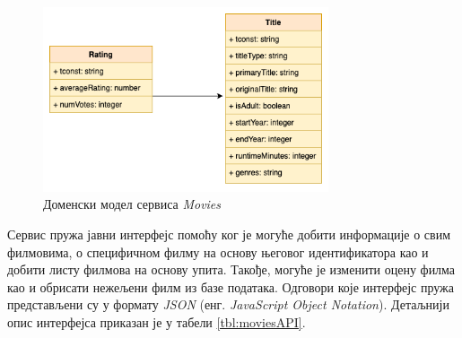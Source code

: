 \documentclass[12pt,oneside]{memoir}
\begin{document}
\begin{figure}[!ht]
  \centering
  \includegraphics[width=0.75\textwidth]{matfmaster/img/moviesShema.png}
  \caption{Доменски модел сервиса \textit{Movies}}
  \label{fig:moviesShema}
\end{figure}
Сервис пружа јавни интерфејс помоћу ког је могуће добити информације о свим филмовима, о специфичном филму на основу његовог идентификатора као и добити листу филмова на основу упита. Такође, могуће је изменити оцену филма као и обрисати нежељени филм из базе података. Одговори које интерфејс пружа представљени су у формату \textit{JSON} (енг. \textit{JavaScript Object Notation}). Детаљнији опис интерфејса приказан је у табели \ref{tbl:moviesAPI}.
\end{document}
